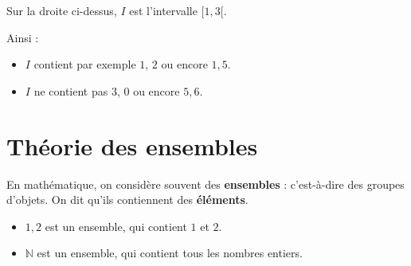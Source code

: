 \documentclass[classe=$2^{de}$]{coursclass}
\begin{document}
\begin{exemple}
	\begin{center}
	\end{center}

	Sur la droite ci-dessus, $I$ est l'intervalle $[1, 3[$.

	Ainsi :
	\begin{itemize}
		\item $I$ contient par exemple $1$, $2$ ou encore $1,5$.
		\item $I$ ne contient pas $3$, $0$ ou encore $5,6$.
	\end{itemize}
\end{exemple}

\section{Théorie des ensembles}

En mathématique, on considère souvent des \textbf{ensembles} : c'est-à-dire des groupes d'objets. On dit qu'ils contiennent des \textbf{éléments}.

\begin{exemple}
	\begin{itemize}
		\item ${1, 2}$ est un ensemble, qui contient $1$ et $2$.
		\item $ℕ$ est un ensemble, qui contient tous les nombres entiers.
	\end{itemize}
\end{exemple}
\end{document}
